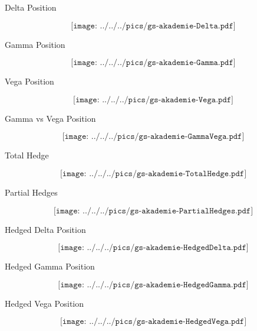 {Delta Position}

$$\texttt{[image: ../../../pics/gs-akademie-Delta.pdf]}$$

{Gamma Position}

$$\texttt{[image: ../../../pics/gs-akademie-Gamma.pdf]}$$

{Vega Position}

$$\texttt{[image: ../../../pics/gs-akademie-Vega.pdf]}$$

{Gamma vs Vega Position}

$$\texttt{[image: ../../../pics/gs-akademie-GammaVega.pdf]}$$

{Total Hedge}

$$\texttt{[image: ../../../pics/gs-akademie-TotalHedge.pdf]}$$

{Partial Hedges}

$$\texttt{[image: ../../../pics/gs-akademie-PartialHedges.pdf]}$$

{Hedged Delta Position}

$$\texttt{[image: ../../../pics/gs-akademie-HedgedDelta.pdf]}$$

{Hedged Gamma Position}

$$\texttt{[image: ../../../pics/gs-akademie-HedgedGamma.pdf]}$$

{Hedged Vega Position}

$$\texttt{[image: ../../../pics/gs-akademie-HedgedVega.pdf]}$$

